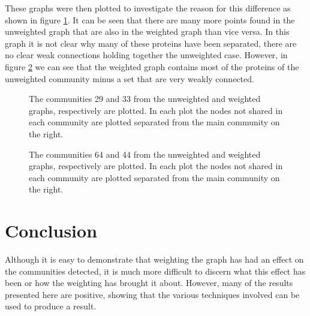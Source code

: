 These graphs were then plotted to investigate the reason for this difference as shown in figure \ref{fig:nx2933}.
It can be seen that there are many more points found in the unweighted graph that are also in the weighted graph than vice versa.
In this graph it is not clear why many of these proteins have been separated, there are no clear weak connections holding together the unweighted case.
However, in figure \ref{fig:nx6444} we can see that the weighted graph contains most of the proteins of the unweighted community minus a set that are very weakly connected.

\begin{figure}
    \centering
     \setlength\figureheight{1in}
    \setlength\figurewidth{1in}
    \setlength\figureheight{1in}
    \setlength\figurewidth{1in}
    \caption{The communities 29 and 33 from the unweighted and weighted graphs, respectively are plotted. In each plot the nodes not shared in each community are plotted separated from the main community on the right.}
    \label{fig:nx2933}
\end{figure}

\begin{figure}
    \centering
     \setlength\figureheight{1in}
    \setlength\figurewidth{1in}
    \setlength\figureheight{1in}
    \setlength\figurewidth{1in}
    \caption{The communities 64 and 44 from the unweighted and weighted graphs, respectively are plotted. In each plot the nodes not shared in each community are plotted separated from the main community on the right.}
    \label{fig:nx6444}
\end{figure}






\section*{Conclusion}

Although it is easy to demonstrate that weighting the graph has had an effect on the communities detected, it is much more difficult to discern what this effect has been or how the weighting has brought it about.
However, many of the results presented here are positive, showing that the various techniques involved can be used to produce a result.

